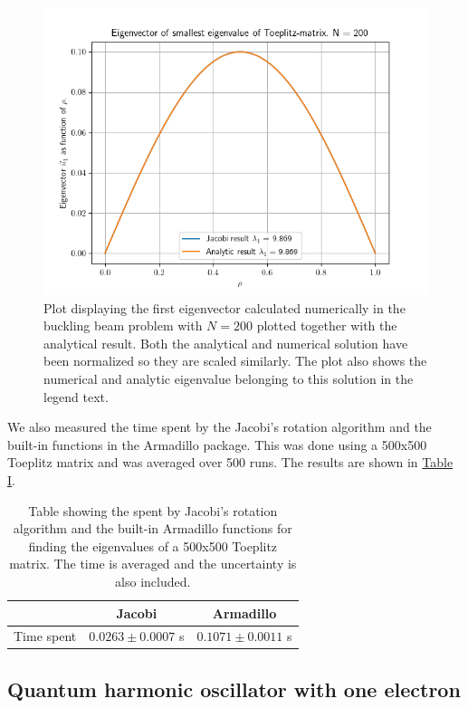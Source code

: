 \documentclass[reprint,english,notitlepage]{revtex4-1}  %
\begin{document}
\begin{figure}[h!] \label{fig:IV:a:1}
\includegraphics[scale=0.6]{toeplitz.png}
\caption{Plot displaying the first eigenvector calculated numerically in the buckling beam problem with $N=200$ plotted together with the analytical result. Both the analytical and numerical solution have been normalized so they are scaled similarly. The plot also shows the numerical and analytic eigenvalue belonging to this solution in the legend text.}
\end{figure}

We also measured the time spent by the Jacobi's rotation algorithm and the built-in functions in the Armadillo package. This was done using a 500x500 Toeplitz matrix and was averaged over 500 runs. The results are shown in \hyperref[table:IV:a:1]{Table I}.

\begin{table}[h!] \label{table:IV:a:1}
\caption{Table showing the spent by Jacobi's rotation algorithm and the built-in Armadillo functions for finding the eigenvalues of a 500x500 Toeplitz matrix. The time is averaged and the uncertainty is also included.}
\begin{tabular}{|c|c|c|}
\hline
 & Jacobi & Armadillo \\
\hline
Time spent & $0.0263 \pm 0.0007$ s & $0.1071 \pm 0.0011$ s \\
\hline
\end{tabular}
\end{table}




\subsection{Quantum harmonic oscillator with one electron} \label{sec:IV:b}
\end{document}
